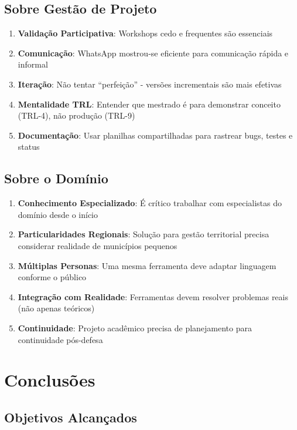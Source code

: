 \documentclass[12pt,a4paper]{report}
\begin{document}
\section{Sobre Gestão de Projeto}

\begin{enumerate}
  \item \textbf{Validação Participativa}: Workshops cedo e frequentes são essenciais
  \item \textbf{Comunicação}: WhatsApp mostrou-se eficiente para comunicação rápida e informal
  \item \textbf{Iteração}: Não tentar ``perfeição'' - versões incrementais são mais efetivas
  \item \textbf{Mentalidade TRL}: Entender que mestrado é para demonstrar conceito (TRL-4), não produção (TRL-9)
  \item \textbf{Documentação}: Usar planilhas compartilhadas para rastrear bugs, testes e status
\end{enumerate}

\section{Sobre o Domínio}

\begin{enumerate}
  \item \textbf{Conhecimento Especializado}: É crítico trabalhar com especialistas do domínio desde o início
  \item \textbf{Particularidades Regionais}: Solução para gestão territorial precisa considerar realidade de municípios pequenos
  \item \textbf{Múltiplas Personas}: Uma mesma ferramenta deve adaptar linguagem conforme o público
  \item \textbf{Integração com Realidade}: Ferramentas devem resolver problemas reais (não apenas teóricos)
  \item \textbf{Continuidade}: Projeto acadêmico precisa de planejamento para continuidade pós-defesa
\end{enumerate}

\newpage

\chapter{Conclusões}

\section{Objetivos Alcançados}
\end{document}
